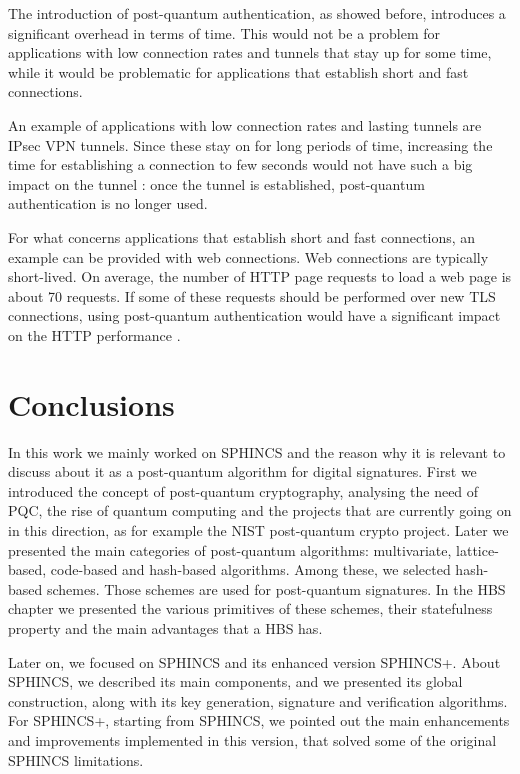 \documentclass[a4paper,12pt]{article}
\begin{document}
The introduction of post-quantum authentication, as showed before, introduces a significant overhead in terms of time. This would not be a problem for applications with low connection rates and tunnels that stay up for some time, while it would be problematic for applications that establish short and fast connections.

An example of applications with low connection rates and lasting tunnels are IPsec VPN tunnels. Since these stay on for long periods of time, increasing the time for establishing a connection to few seconds would not have such a big impact on the tunnel \cite{53_AuthTests}: once the tunnel is established, post-quantum authentication is no longer used. 

For what concerns applications that establish short and fast connections, an example can be provided with web connections. Web connections are typically short-lived. On average, the number of HTTP page requests to load a web page is about 70 requests.
If some of these requests should be performed over new TLS connections, using post-quantum authentication would have a significant impact on the HTTP performance \cite{53_AuthTests}.

\section{Conclusions}

In this work we mainly worked on SPHINCS and the reason why it is relevant to discuss about it as a post-quantum algorithm for digital signatures. First we introduced the concept of post-quantum cryptography, analysing the need of PQC, the rise of quantum computing and the projects that are currently going on in this direction, as for example the NIST post-quantum crypto project. Later we presented the main categories of post-quantum algorithms: multivariate, lattice-based, code-based and hash-based algorithms.
Among these, we selected hash-based schemes. Those schemes are used for post-quantum signatures. 
In the HBS chapter we presented the various primitives of these schemes, their statefulness property and the main advantages that a HBS has.

Later on, we focused on SPHINCS and its enhanced version SPHINCS+. About SPHINCS, we described its main components, and we presented its global construction, along with its key generation, signature and verification algorithms. For SPHINCS+, starting from SPHINCS, we pointed out the main enhancements and improvements implemented in this version, that solved some of the original SPHINCS limitations.
\end{document}
